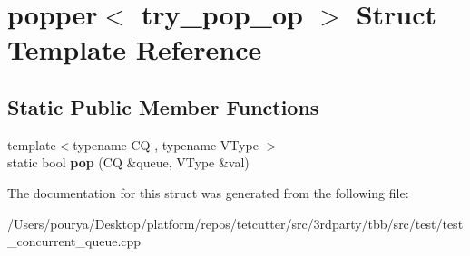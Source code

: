\hypertarget{structpopper_3_01try__pop__op_01_4}{}\section{popper$<$ try\+\_\+pop\+\_\+op $>$ Struct Template Reference}
\label{structpopper_3_01try__pop__op_01_4}
\subsection*{Static Public Member Functions}
\begin{DoxyCompactItemize}
\item 
\hypertarget{structpopper_3_01try__pop__op_01_4_a86bf2a3ea50f747f358e4dee4262a720}{}{\footnotesize template$<$typename C\+Q , typename V\+Type $>$ }\\static bool {\bfseries pop} (C\+Q \&queue, V\+Type \&val)\label{structpopper_3_01try__pop__op_01_4_a86bf2a3ea50f747f358e4dee4262a720}

\end{DoxyCompactItemize}


The documentation for this struct was generated from the following file\+:\begin{DoxyCompactItemize}
\item 
/\+Users/pourya/\+Desktop/platform/repos/tetcutter/src/3rdparty/tbb/src/test/test\+\_\+concurrent\+\_\+queue.\+cpp\end{DoxyCompactItemize}
